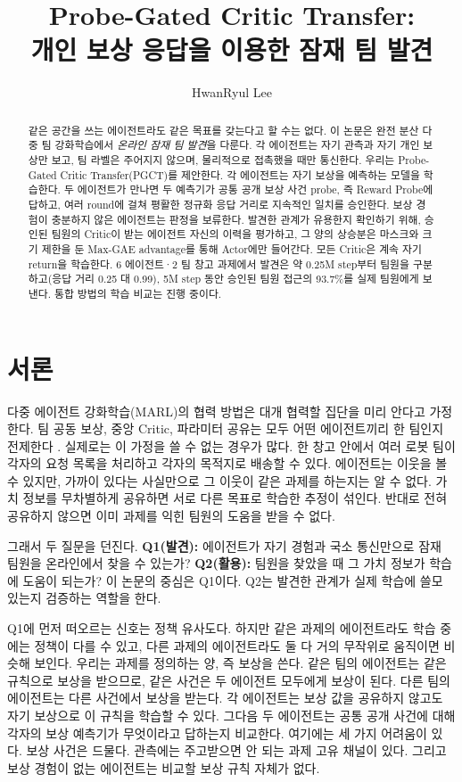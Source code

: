 \documentclass[10pt,twocolumn,letterpaper]{article}
\title{Probe-Gated Critic Transfer:\\개인 보상 응답을 이용한 잠재 팀 발견}
\author{HwanRyul Lee}
\date{}
\begin{document}
\maketitle

\begin{abstract}
같은 공간을 쓰는 에이전트라도 같은 목표를 갖는다고 할 수는 없다. 이 논문은 완전 분산 다중 팀 강화학습에서 \emph{온라인 잠재 팀 발견}을 다룬다. 각 에이전트는 자기 관측과 자기 개인 보상만 보고, 팀 라벨은 주어지지 않으며, 물리적으로 접촉했을 때만 통신한다. 우리는 Probe-Gated Critic Transfer(PGCT)를 제안한다. 각 에이전트는 자기 보상을 예측하는 모델을 학습한다. 두 에이전트가 만나면 두 예측기가 공통 공개 보상 사건 probe, 즉 Reward Probe에 답하고, 여러 round에 걸쳐 평활한 정규화 응답 거리로 지속적인 일치를 승인한다. 보상 경험이 충분하지 않은 에이전트는 판정을 보류한다. 발견한 관계가 유용한지 확인하기 위해, 승인된 팀원의 Critic이 받는 에이전트 자신의 이력을 평가하고, 그 양의 상승분은 마스크와 크기 제한을 둔 Max-GAE advantage를 통해 Actor에만 들어간다. 모든 Critic은 계속 자기 return을 학습한다. 6 에이전트·2 팀 창고 과제에서 발견은 약 0.25M step부터 팀원을 구분하고(응답 거리 0.25 대 0.99), 5M step 동안 승인된 팀원 접근의 93.7\%를 실제 팀원에게 보낸다. 통합 방법의 학습 비교는 진행 중이다.
\end{abstract}

\section{서론}
다중 에이전트 강화학습(MARL)의 협력 방법은 대개 협력할 집단을 미리 안다고 가정한다. 팀 공동 보상, 중앙 Critic, 파라미터 공유는 모두 어떤 에이전트끼리 한 팀인지 전제한다 \citep{mappo,seps}. 실제로는 이 가정을 쓸 수 없는 경우가 많다. 한 창고 안에서 여러 로봇 팀이 각자의 요청 목록을 처리하고 각자의 목적지로 배송할 수 있다. 에이전트는 이웃을 볼 수 있지만, 가까이 있다는 사실만으로 그 이웃이 같은 과제를 하는지는 알 수 없다. 가치 정보를 무차별하게 공유하면 서로 다른 목표로 학습한 추정이 섞인다. 반대로 전혀 공유하지 않으면 이미 과제를 익힌 팀원의 도움을 받을 수 없다.

그래서 두 질문을 던진다. \textbf{Q1(발견):} 에이전트가 자기 경험과 국소 통신만으로 잠재 팀원을 온라인에서 찾을 수 있는가? \textbf{Q2(활용):} 팀원을 찾았을 때 그 가치 정보가 학습에 도움이 되는가? 이 논문의 중심은 Q1이다. Q2는 발견한 관계가 실제 학습에 쓸모 있는지 검증하는 역할을 한다.

Q1에 먼저 떠오르는 신호는 정책 유사도다. 하지만 같은 과제의 에이전트라도 학습 중에는 정책이 다를 수 있고, 다른 과제의 에이전트라도 둘 다 거의 무작위로 움직이면 비슷해 보인다. 우리는 과제를 정의하는 양, 즉 보상을 쓴다. 같은 팀의 에이전트는 같은 규칙으로 보상을 받으므로, 같은 사건은 두 에이전트 모두에게 보상이 된다. 다른 팀의 에이전트는 다른 사건에서 보상을 받는다. 각 에이전트는 보상 값을 공유하지 않고도 자기 보상으로 이 규칙을 학습할 수 있다. 그다음 두 에이전트는 공통 공개 사건에 대해 각자의 보상 예측기가 무엇이라고 답하는지 비교한다. 여기에는 세 가지 어려움이 있다. 보상 사건은 드물다. 관측에는 주고받으면 안 되는 과제 고유 채널이 있다. 그리고 보상 경험이 없는 에이전트는 비교할 보상 규칙 자체가 없다.
\end{document}

